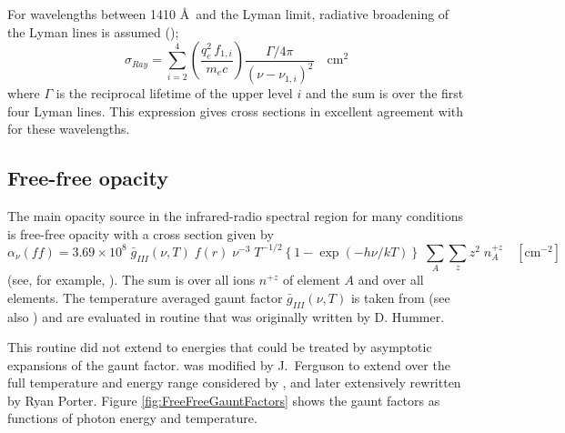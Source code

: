 For wavelengths between 1410 \AA\  and the Lyman limit, radiative
broadening of the Lyman lines is assumed (\citealp{Mihalas1978});
\begin{equation}
{\sigma _{Ray}} = \sum\limits_{i = 2}^4 {\left(
{\frac{{q_e^2\,{f_{1,i}}}}{{{m_e}c}}} \right)} \frac{{\Gamma /4\pi
}}{{{{\left( {\nu  - {\nu _{1,i}}} \right)}^2}}}\quad {\mathrm{c}}{{\mathrm{m}}^2}%
\end{equation}
where $\Gamma$ is the reciprocal lifetime of the upper level $i$ and the sum is over
the first four Lyman lines.  This expression gives cross sections in
excellent agreement with \citet{Gavrila1967} for these wavelengths.

\subsection{Free-free opacity}

The main opacity source in the infrared-radio spectral region for many
conditions is free-free opacity with a cross section given by
\begin{equation}
{\alpha _\nu }(ff) = 3.69 \times {10^8}\;{\bar g_{III}}\left( {\nu ,T}
\right)\;f(r)\;{\nu ^{ - 3}}\;{T^{ - 1/2}}\left\{ {1 - \exp \left( { - h\nu
/kT} \right)} \right\}\;\sum\limits_A {} \sum\limits_z {{z^2}\;n_A^{ + z}}
\quad [\mathrm{cm}^{-2}]%
\end{equation}
(see, for example, \citealp{Mihalas1978}).
The sum is over all ions $n^{+z}$ of element
$A$ and over all elements.
The temperature averaged gaunt factor
${\bar g_{III}}(\nu ,T)$
is taken from \citet{Hummer1988} (see also \citealp{Karzas1961}) and are
evaluated in routine  that was originally written by D. Hummer.

This routine did not extend to energies that could be treated by
asymptotic expansions of the gaunt factor.
 was modified by
J.~Ferguson to extend over the full temperature and energy range considered
by \Cloudy, and later extensively rewritten by Ryan Porter.
Figure \ref{fig:FreeFreeGauntFactors} shows
the gaunt factors as functions of photon energy and temperature.

